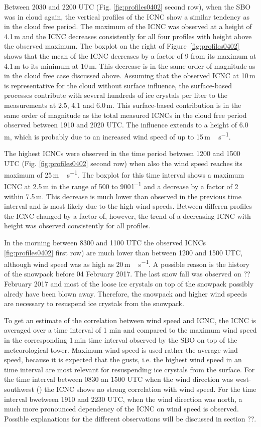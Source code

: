 \documentclass[draft,linenumbers]{agujournal}
\begin{document}
{Between 2030 and 2200 UTC (Fig. \ref{fig:profiles0402} second row), when the SBO was in cloud again, the vertical profiles of the ICNC show a similar tendency as in the cloud free period. The maximum of the ICNC was observed at a height of 4.1\,\si{m} and the ICNC decreases consistently for all four profiles with height above the observed maximum. The boxplot on the right of Figure \,\ref{fig:profiles0402} shows that the mean of the ICNC decreases by a factor of 9 from its maximum at 4.1\,\si{m} to its minimum at 10\,\si{m}. This decrease is in the same order of magnitude as in the cloud free case discussed above. Assuming that the observed ICNC at 10\,\si{m} is representative for the cloud without surface influence, the surface-based processes contribute with several hundreds of ice crystals per liter to the measurements at 2.5, 4.1 and 6.0\,\si{m}. This surface-based contribution is in the same order of magnitude as the total measured ICNCs in the cloud free period observed between 1910 and 2020 UTC. The influence extends to a height of 6.0\,\si{m}, which is probably due to an increased wind speed of up to 15\,\si{m\,s^{-1}}. 

The highest ICNCs were observed in the time period between 1200 and 1500 UTC (Fig. \ref{fig:profiles0402} second row) when also the wind speed reaches its maximum of 25\,\si{m\,s^{-1}}. The boxplot for this time interval shows a maximum ICNC at 2.5\,\si{m} in the range of 500 to 900\,\si{l^{-1}} and a decrease by a factor of 2 within 7.5\,\si{m}. This decrease is much lower than observed in the previous time interval and is most likely due to the high wind speeds. Between differen profiles the ICNC changed by a factor of, however, the trend of a decreasing ICNC with height was observed consistently for all profiles.

In the morning between 8300 and 1100 UTC the observed ICNCs \ref{fig:profiles0402} first row) are much lower than between 1200 and 1500 UTC, although wind speed was as high as 20\,\si{m\,s^{-1}}. A possible reason is the history of the snowpack before 04 February 2017. The last snow fall was observed on ?? February 2017 and most of the loose ice crystals on top of the snowpack possibly alredy have been blown away. Therefore, the snowpack and higher wind speeds are necessary to resuspend ice crystals from the snowpack. 

To get an estimate of the correlation between wind speed and ICNC, the ICNC is averaged over a time interval of 1 min and compared to the maximum wind speed in the corresponding 1\,\si{min} time interval observed by the SBO on top of the meteorological tower. Maximum wind speed is used rather the average wind speed, because it is expected that the gusts, i.e. the highest wind speed in an time interval are most relevant for resuspending ice crystals from the surface. For the time interval between 0830 an 1500 UTC when the wind direction was west-southwest () the ICNC shows no strong correlation with wind speed. For the time interval bwetween 1910 and 2230 UTC, when the wind direction was north, a much more pronounced dependency of the ICNC on wind speed is observed. Possible explanations for the different observations will be discussed in section ??. 

}
\end{document}

